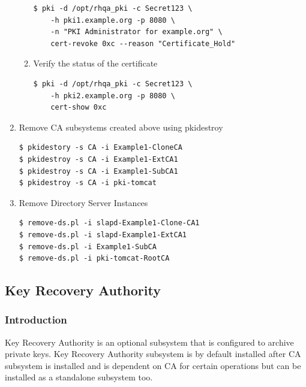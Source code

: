 \documentclass[a4paper]{article}
\begin{document}
\begin{enumerate}[label*=\arabic*.]
\begin{enumerate}[label*=\arabic*.]
\begin{lstlisting}[style=bashInputStyle]
$ pki -d /opt/rhqa_pki -c Secret123 \
    -h pki1.example.org -p 8080 \
    -n "PKI Administrator for example.org" \
    cert-revoke 0xc --reason "Certificate_Hold"
                    \end{lstlisting}
            \item Verify the status of the certificate
                \begin{lstlisting}[style=bashInputStyle]
$ pki -d /opt/rhqa_pki -c Secret123 \
    -h pki2.example.org -p 8080 \
    cert-show 0xc
                \end{lstlisting}
        \end{enumerate}
        \item Remove CA subsystems created above using pkidestroy 
            \begin{lstlisting}[style=bashInputStyle]
$ pkidestory -s CA -i Example1-CloneCA
$ pkidestroy -s CA -i Example1-ExtCA1 
$ pkidestroy -s CA -i Example1-SubCA1
$ pkidestroy -s CA -i pki-tomcat
            \end{lstlisting}
        \item Remove Directory Server Instances 
            \begin{lstlisting}[style=bashInputStyle]
$ remove-ds.pl -i slapd-Example1-Clone-CA1
$ remove-ds.pl -i slapd-Example1-ExtCA1
$ remove-ds.pl -i Example1-SubCA
$ remove-ds.pl -i pki-tomcat-RootCA
            \end{lstlisting}
    \end{enumerate}
\subsection{Key Recovery Authority}
\subsubsection{Introduction}
Key Recovery Authority is an optional subsystem that is configured to archive private keys. Key Recovery Authority
subsystem is by default installed after CA subsystem is installed and is dependent on CA for certain operations
but can be installed as a standalone subsystem too.
\end{document}
